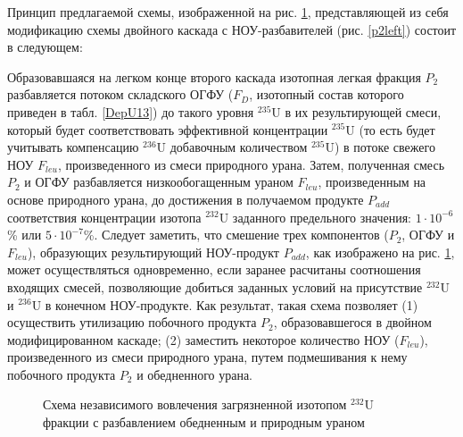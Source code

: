 Принцип предлагаемой схемы, изображенной на рис. \ref{P2utilization}, представляющей из себя модификацию схемы двойного каскада с НОУ-разбавителей (рис. \ref{p2left}) состоит в следующем:

Образовавшаяся на легком конце второго каскада изотопная легкая фракция $P_2$ разбавляется потоком складского ОГФУ ($F_D$, изотопный состав которого приведен в табл. \ref{DepU13}) до такого уровня $^{235}$U в их результирующей смеси, который будет соответствовать эффективной концентрации $^{235}$U (то есть будет учитывать компенсацию $^{236}$U добавочным количеством $^{235}$U) в потоке свежего НОУ $F_{leu}$, произведенного из смеси природного урана. Затем, полученная смесь $P_2$ и ОГФУ разбавляется низкообогащенным ураном $F_{leu}$, произведенным на основе природного урана, до достижения в получаемом продукте $P_{add}$ соответствия концентрации изотопа $^{232}$U заданного предельного значения: $1\cdot10^{-6}$\% или $5\cdot10^{-7}$\%. Следует заметить, что смешение трех компонентов ($P_2$, ОГФУ и $F_{leu}$), образующих результирующий НОУ-продукт $P_{add}$, как изображено на рис. \ref{P2utilization}, может осуществляться одновременно, если заранее расчитаны соотношения входящих смесей, позволяющие добиться заданных условий на присутствие $^{232}$U и $^{236}$U в конечном НОУ-продукте. Как результат, такая схема позволяет (1) осуществить утилизацию побочного продукта $P_2$, образовавшегося в двойном модифицированном каскаде; (2) заместить некоторое количество НОУ ($F_{leu}$), произведенного из смеси природного урана, путем подмешивания к нему побочного продукта $P_2$ и обедненного урана.

\begin{figure}[ht]
    \caption{Схема независимого вовлечения загрязненной изотопом $^{232}$U фракции с разбавлением обедненным и природным ураном}\label{P2utilization}
\end{figure}

